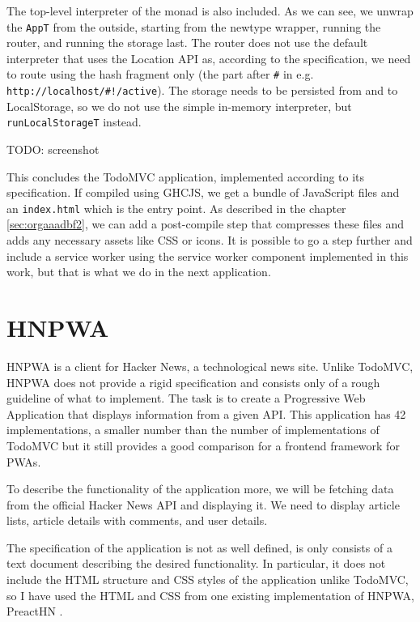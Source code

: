 \documentclass[english,odsaz]{fitthesis}
\begin{document}
The top-level interpreter of the monad is also included. As we can see, we
unwrap the \texttt{AppT} from the outside, starting from the newtype wrapper, running the
router, and running the storage last. The router does not use the default
interpreter that uses the Location API as, according to the specification, we
need to route using the hash fragment only (the part after \texttt{\#} in
e.g. \texttt{http://localhost/\#!/active}). The storage needs to be persisted from and to
LocalStorage, so we do not use the simple in-memory interpreter, but
\texttt{runLocalStorageT} instead.

TODO: screenshot

This concludes the TodoMVC application, implemented according to its
specification. If compiled using GHCJS, we get a bundle of JavaScript files and
an \texttt{index.html} which is the entry point. As described in the chapter \ref{sec:orgaaadbf2}, we
can add a post-compile step that compresses these files and adds any necessary
assets like CSS or icons. It is possible to go a step further and include a
service worker using the service worker component implemented in this work, but
that is what we do in the next application.

\section{HNPWA}
\label{sec:org765d7be}
HNPWA \cite{hnpwa} is a client for Hacker News, a technological news site. Unlike
TodoMVC, HNPWA does not provide a rigid specification and consists only of a
rough guideline of what to implement. The task is to create a Progressive Web
Application that displays information from a given API. This application has 42
implementations, a smaller number than the number of implementations of TodoMVC
but it still provides a good comparison for a frontend framework for PWAs.

To describe the functionality of the application more, we will be fetching data
from the official Hacker News API and displaying it. We need to display article
lists, article details with comments, and user details.

The specification of the application is not as well defined, is only consists of
a text document describing the desired functionality. In particular, it does not
include the HTML structure and CSS styles of the application unlike TodoMVC, so
I have used the HTML and CSS from one existing implementation of HNPWA, PreactHN
\cite{preacthn}.
\end{document}

